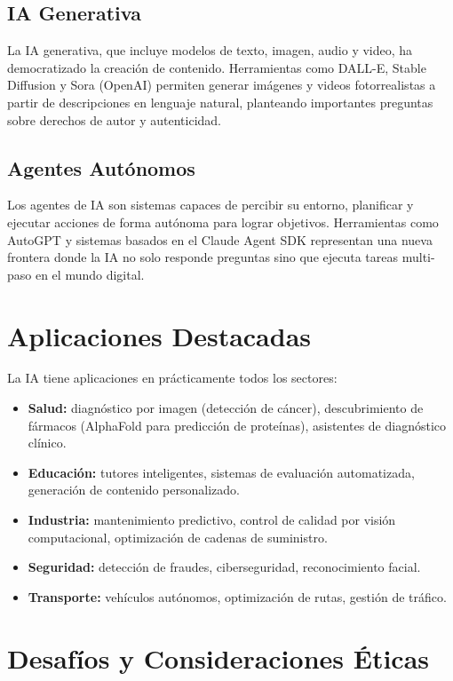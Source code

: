 \documentclass[12pt, a4paper]{article}
\begin{document}
\subsection{IA Generativa}
La IA generativa, que incluye modelos de texto, imagen, audio y video, ha democratizado la creación de contenido. Herramientas como DALL-E, Stable Diffusion y Sora (OpenAI) permiten generar imágenes y videos fotorrealistas a partir de descripciones en lenguaje natural, planteando importantes preguntas sobre derechos de autor y autenticidad.

\subsection{Agentes Autónomos}
Los agentes de IA son sistemas capaces de percibir su entorno, planificar y ejecutar acciones de forma autónoma para lograr objetivos. Herramientas como AutoGPT y sistemas basados en el Claude Agent SDK representan una nueva frontera donde la IA no solo responde preguntas sino que ejecuta tareas multi-paso en el mundo digital.

\section{Aplicaciones Destacadas}

La IA tiene aplicaciones en prácticamente todos los sectores:

\begin{itemize}
    \item \textbf{Salud:} diagnóstico por imagen (detección de cáncer), descubrimiento de fármacos (AlphaFold para predicción de proteínas), asistentes de diagnóstico clínico.
    \item \textbf{Educación:} tutores inteligentes, sistemas de evaluación automatizada, generación de contenido personalizado.
    \item \textbf{Industria:} mantenimiento predictivo, control de calidad por visión computacional, optimización de cadenas de suministro.
    \item \textbf{Seguridad:} detección de fraudes, ciberseguridad, reconocimiento facial.
    \item \textbf{Transporte:} vehículos autónomos, optimización de rutas, gestión de tráfico.
\end{itemize}

\section{Desafíos y Consideraciones Éticas}
\end{document}
